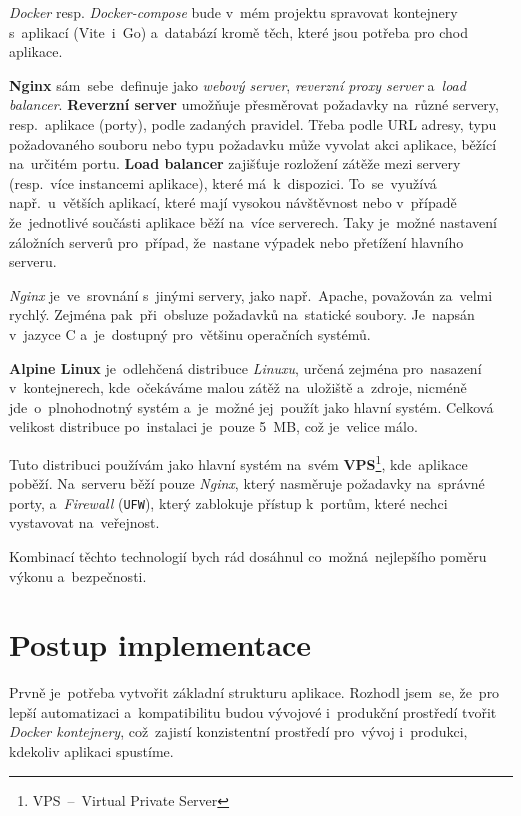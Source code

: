 \documentclass[10pt,a4paper]{article}
\begin{document}
            \emph{Docker} resp. \emph{Docker-compose} bude v~mém projektu spravovat kontejnery s~aplikací (Vite~i~Go) a~databází kromě těch, které jsou potřeba pro chod aplikace.

            \textbf{Nginx} sám~sebe~definuje jako \emph{webový server}, \emph{reverzní proxy server} a~\emph{load balancer}. \textbf{Reverzní server} umožňuje přesměrovat požadavky na~různé servery, resp.~aplikace (porty), podle zadaných pravidel. Třeba podle URL adresy, typu požadovaného souboru nebo typu požadavku může vyvolat akci aplikace, běžící na~určitém portu. \textbf{Load balancer} zajišťuje rozložení zátěže mezi servery (resp.~více instancemi aplikace), které má~k~dispozici. To~se~využívá např.~u~větších aplikací, které mají vysokou návštěvnost nebo v~případě že~jednotlivé součásti aplikace běží na~více serverech. Taky je~možné nastavení záložních serverů pro~případ, že~nastane výpadek nebo přetížení hlavního serveru.
            
            \emph{Nginx} je~ve~srovnání s~jinými servery, jako např.~Apache, považován za~velmi rychlý. Zejména pak~při~obsluze požadavků na~statické soubory. Je~napsán v~jazyce C a~je~dostupný pro~většinu operačních systémů. \cite{WhatNGINX}

            \textbf{Alpine Linux} je~odlehčená distribuce \emph{Linuxu}, určená zejména pro~nasazení v~kontejnerech, kde~očekáváme malou zátěž na~uložiště a~zdroje, nicméně jde~o~plnohodnotný systém a~je~možné jej~použít jako hlavní systém. Celková velikost distribuce po~instalaci je~pouze 5~MB, což je~velice málo.

            Tuto distribuci používám jako hlavní systém na~svém \textbf{VPS}\footnote{VPS~--~Virtual Private Server}, kde~aplikace poběží. Na~serveru běží pouze \emph{Nginx}, který nasměruje požadavky na~správné porty, a~\emph{Firewall} (\texttt{UFW}), který zablokuje přístup k~portům, které nechci vystavovat na~veřejnost.

            Kombinací těchto technologií bych rád dosáhnul co~možná~nejlepšího poměru výkonu a~bezpečnosti.
	
	\section{Postup implementace}
        Prvně je~potřeba vytvořit základní strukturu aplikace. Rozhodl jsem~se, že~pro lepší automatizaci a~kompatibilitu budou vývojové i~produkční prostředí tvořit \emph{Docker kontejnery}, což~zajistí konzistentní prostředí pro~vývoj i~produkci, kdekoliv aplikaci spustíme.
\end{document}
